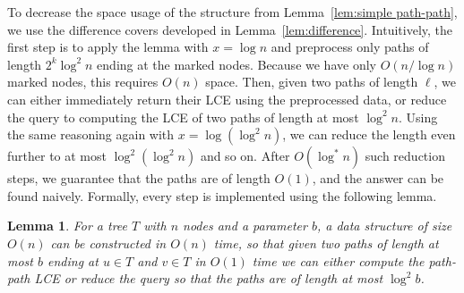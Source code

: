 \documentclass [10pt]{article}
\newtheorem{lemma}{Lemma}
\begin{document}
To decrease the space usage of the structure from Lemma~\ref{lem:simple path-path}, we use the difference covers developed in
Lemma~\ref{lem:difference}. Intuitively, the first step is to apply the lemma with $x=\log n$ and preprocess only paths of length $2^{k}\log^{2} n$
ending at the marked nodes. Because we have only $O(n/\log n)$ marked nodes, this requires $O(n)$ space. Then, given two paths of length
$\ell$, we can either immediately return their LCE using the preprocessed data, or reduce the query to computing
the LCE of two paths of length at most $\log^{2}n$. Using the same reasoning again with $x=\log (\log^{2}n)$,
we can reduce the length even further to at most $\log^{2}(\log^{2}n)$ and so on. After $O(\log^{*}n)$ such reduction steps, we guarantee that the
paths are of length $O(1)$, and the answer can be found naively. Formally, every step is implemented using the following lemma.

\begin{lemma}
For a tree $T$ with $n$ nodes and a parameter $b$, a data structure of size $O(n)$ can be constructed in $O(n)$ time, so that given two paths of
length at most $b$ ending at $u\in T$ and $v\in T$ in $O(1)$ time we can either compute the path-path LCE or reduce the query so that
the paths are of length at most $\log^{2}b$.
\label{lem:path-path reduction}
\end{lemma}
\end{document}
